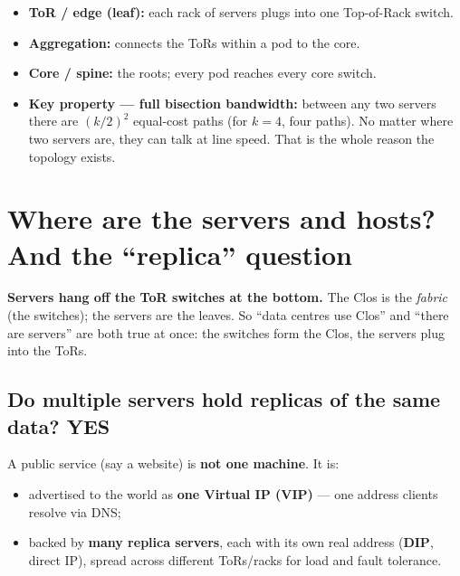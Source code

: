 \documentclass[11pt]{article}
\newcommand{\yes}{\textcolor{good}{\textbf{YES}}}
\begin{document}
\begin{itemize}[leftmargin=1.4em]
  \item \textbf{ToR / edge (leaf):} each rack of servers plugs into one Top-of-Rack switch.
  \item \textbf{Aggregation:} connects the ToRs within a pod to the core.
  \item \textbf{Core / spine:} the roots; every pod reaches every core switch.
  \item \textbf{Key property --- full bisection bandwidth:} between any two servers there are
  $(k/2)^2$ equal-cost paths (for $k=4$, four paths). No matter where two servers are, they can talk at
  line speed. That is the whole reason the topology exists.
\end{itemize}

\section{Where are the servers and hosts? And the ``replica'' question}
\textbf{Servers hang off the ToR switches at the bottom.} The Clos is the \emph{fabric} (the switches);
the servers are the leaves. So ``data centres use Clos'' and ``there are servers'' are both true at once:
the switches form the Clos, the servers plug into the ToRs.

\subsection*{Do multiple servers hold replicas of the same data? \yes}
A public service (say a website) is \textbf{not one machine}. It is:
\begin{itemize}[leftmargin=1.4em]
  \item advertised to the world as \textbf{one Virtual IP (VIP)} --- one address clients resolve via DNS;
  \item backed by \textbf{many replica servers}, each with its own real address (\textbf{DIP}, direct IP),
  spread across different ToRs/racks for load and fault tolerance.
\end{itemize}
\end{document}
